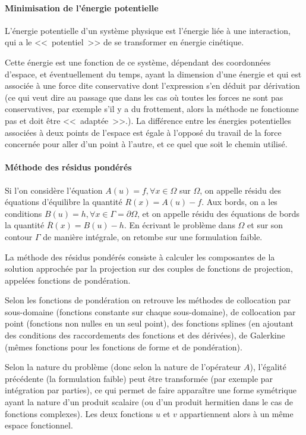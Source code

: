 \medskip
\paragraph{Minimisation de l'énergie potentielle}
L'énergie potentielle d'un système physique est l'énergie liée à une interaction, qui a le
<<~potentiel~>> de se transformer en énergie cinétique.

Cette énergie est une fonction de ce système, dépendant des coordonnées d'espace,
et éventuellement du temps, ayant la dimension d'une énergie et qui est associée à une
force dite conservative dont l'expression s'en déduit par dérivation (ce qui veut dire au passage
que dans les cas où toutes les forces ne sont pas conservatives, par exemple s'il y a
du frottement, alors la méthode ne fonctionne pas et doit être <<~adaptée~>>.).
La différence entre les énergies potentielles associées à deux points de l'espace est
égale à l'opposé du travail de la force concernée pour aller d'un point à l'autre, et ce
quel que soit le chemin utilisé.

\medskip
\paragraph{Méthode des résidus pondérés}\label{Sec-ResPond}
Si l'on considère l'équation $A(u)=f, \forall x\in\Omega$ sur $\Omega$, on appelle résidu
des équations d'équilibre la quantité $R(x)=A(u)-f$. Aux bords, on a les conditions
$B(u)=h, \forall x\in\Gamma=\partial\Omega$, et on appelle résidu des équations de bords
la quantité $\overline{R}(x)=B(u)-h$. En écrivant le problème dans $\Omega$ et sur
son contour $\Gamma$ de manière intégrale, on retombe sur une formulation faible.

La méthode des résidus pondérés consiste à calculer les composantes de la
solution approchée par la projection sur des couples de fonctions de projection,
appelées fonctions de pondération.

Selon les fonctions de pondération on retrouve les méthodes de collocation par
sous-domaine (fonctions constante sur chaque sous-domaine), de collocation par point
(fonctions non nulles en un seul point), des fonctions splines (en ajoutant des conditions
des raccordements des fonctions et des dérivées), de Galerkine
(mêmes fonctions
pour les fonctions de forme et de pondération).

\medskip
Selon la nature du problème (donc selon la nature de l'opérateur $A$),
l'égalité précédente (la formulation faible) peut être transformée
(par exemple par intégration par parties), ce qui permet de faire apparaître une
forme symétrique ayant la nature d'un produit scalaire (ou d'un produit hermitien dans le cas
de fonctions complexes).
Les deux fonctions $u$ et $v$ appartiennent alors à un même espace fonctionnel.

